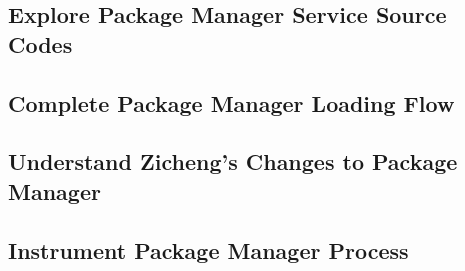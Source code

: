 \subsection{Explore Package Manager Service Source Codes}
\subsection{Complete Package Manager Loading Flow}

\subsection{Understand Zicheng's Changes to Package Manager}
\subsection{Instrument Package Manager Process}


% 







